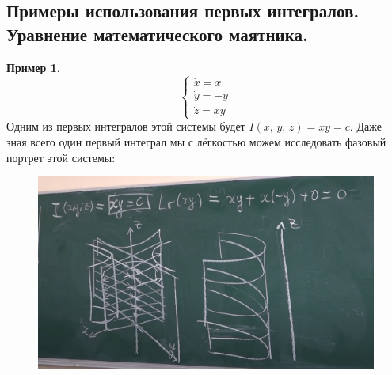 \documentclass[a4paper,12pt]{article}
\theoremstyle{plain}
\theoremstyle{definition}
\newtheorem*{example}{Пример}
\theoremstyle{remark}
\begin{document}
\subsection{Примеры использования первых интегралов. Уравнение математического маятника.}
\begin{example}
	\[
		\begin{cases}
			\dot{x} = x  \\
			\dot{y} = -y \\
			\dot{z} = xy
		\end{cases}
	\]
	Одним из первых интегралов этой системы будет $I(x,\,y,\,z) = xy = c$. Даже зная всего один первый интеграл мы с лёгкостью можем исследовать фазовый портрет этой системы:

	\begin{figure}[h]
		\includegraphics[scale=0.7]{img/hyper_rusalli.png}
	\end{figure}

\end{example}
\end{document}
